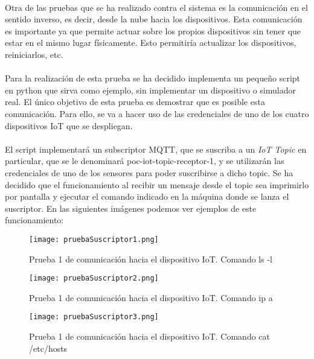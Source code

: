 \documentclass[../../memoria.tex]{subfiles}
\begin{document}
\paragraph{}
Otra de las pruebas que se ha realizado contra el sistema es la comunicación en el sentido inverso, es decir, desde la nube hacia los dispositivos. Esta comunicación es importante ya que permite actuar sobre los propios dispositivos sin tener que estar en el mismo lugar físicamente. Esto permitiría actualizar los dispositivos, reiniciarlos, etc.

\paragraph{}
Para la realización de esta prueba se ha decidido implementa un pequeño script en python que sirva como ejemplo, sin implementar un dispositivo o simulador real. El único objetivo de esta prueba es demostrar que es posible esta comunicación. Para ello, se va a hacer uso de las credenciales de uno de los cuatro dispositivos IoT que se despliegan.

\paragraph{}
El script implementará un subscriptor MQTT, que se suscriba a un \textit{IoT Topic} en particular, que se le denominará poc-iot-topic-receptor-1, y se utilizarán las credenciales de uno de los sensores para poder suscribirse a dicho topic. Se ha decidido que el funcionamiento al recibir un mensaje desde el topic sea imprimirlo por pantalla y ejecutar el comando indicado en la máquina donde se lanza el suscriptor. En las siguientes imágenes podemos ver ejemplos de este funcionamiento:

\begin{figure}[H]
    \centering
    \texttt{[image: pruebaSuscriptor1.png]}
    \caption{Prueba 1 de comunicación hacia el dispositivo IoT. Comando ls -l}
    \label{fig:pruebaSuscriptor1}
\end{figure}

\begin{figure}[H]
    \centering
    \texttt{[image: pruebaSuscriptor2.png]}
    \caption{Prueba 1 de comunicación hacia el dispositivo IoT. Comando ip a}
    \label{fig:pruebaSuscriptor2}
\end{figure}

\begin{figure}[H]
    \centering
    \texttt{[image: pruebaSuscriptor3.png]}
    \caption{Prueba 1 de comunicación hacia el dispositivo IoT. Comando cat /etc/hosts}
    \label{fig:pruebaSuscriptor3}
\end{figure}
\end{document}
